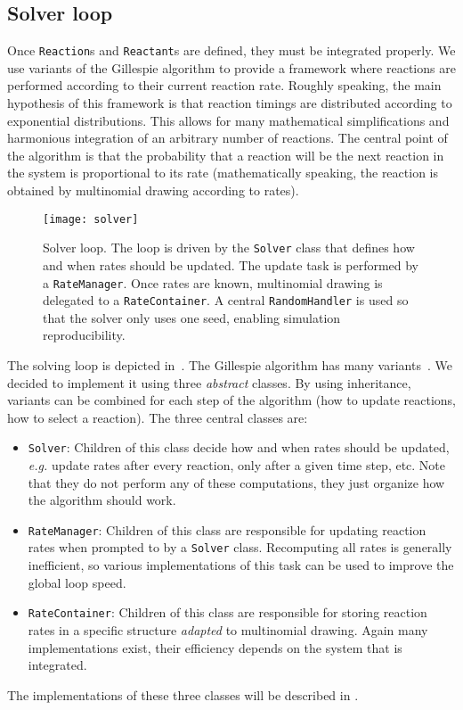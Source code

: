 
\subsection{Solver loop}

Once \texttt{Reaction}s and \texttt{Reactant}s are defined,
they must be integrated properly.
We use variants of the Gillespie algorithm to provide a framework
where reactions are performed according to their current reaction rate.
Roughly speaking, the main hypothesis of this framework is that
reaction timings are distributed according to exponential distributions.
This allows for many mathematical simplifications and harmonious integration
of an arbitrary number of reactions.
The central point of the algorithm is that the probability that a reaction
will be the next reaction in the system is proportional to its rate
(mathematically speaking, the reaction is obtained by multinomial drawing according to rates).

\begin{figure}[!h]
  \centering
  \texttt{[image: solver]}
  \caption{Solver loop.
  The loop is driven by the \texttt{Solver} class that defines
  how and when rates should be updated.
  The update task is performed by a \texttt{RateManager}.
  Once rates are known, multinomial drawing is delegated to a \texttt{RateContainer}.
  A central \texttt{RandomHandler} is used so that the solver only uses one seed,
  enabling simulation reproducibility.}
\label{fig:solver}
\end{figure}

The solving loop is depicted in~.
The Gillespie algorithm has many variants~.
We decided to implement it using three \emph{abstract} classes.
By using inheritance, variants can be combined for each step of the algorithm
(how to update reactions, how to select a reaction).
The three central classes are:
\begin{itemize}
  \item \texttt{Solver}:
  Children of this class decide how and when rates should be updated,
  \textit{e.g.} update rates after every reaction, only after a given time step, etc.
  Note that they do not perform any of these computations,
  they just organize how the algorithm should work.
  \item \texttt{RateManager}:
  Children of this class are responsible for updating reaction rates
  when prompted to by a \texttt{Solver} class.
  Recomputing all rates is generally inefficient,
  so various implementations of this task can be used to improve the global loop speed.
  \item \texttt{RateContainer}: Children of this class are responsible for storing reaction rates
  in a specific structure \emph{adapted} to multinomial drawing.
  Again many implementations exist, their efficiency depends on the system that is integrated.
\end{itemize}
The implementations of these three classes will be described in .
